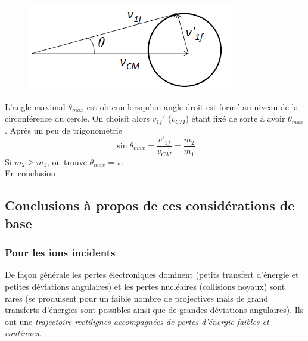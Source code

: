 	\begin{figure}
	\vspace{-5mm}
	\includegraphics[scale=0.65]{ch1/image12.png}
	\end{figure}

L'angle maximal $\theta_{max}$ est obtenu lorsqu'un angle droit est formé au niveau de la
circonférence du cercle. On choisit alors $v_{1f}'$ ($v_{CM}$) étant fixé de sorte à avoir
$\theta_{max}$. Après un peu de trigonométrie
\begin{equation}
\sin{\theta_{max}}=\frac{v'_{1f}}{v_{CM}}=\frac{m_2}{m_1}
\end{equation}
Si $m_2\geq m_1$, on trouve $\theta_{max}=\pi$. \\

En conclusion\\


\subsection{Conclusions à propos de ces considérations de base}
\subsubsection{Pour les ions incidents}
De façon générale les pertes électroniques dominent (petits transfert d'énergie et petites déviations
angulaires) et les pertes nucléaires (collisions noyaux) sont rares (se produisent pour un 
faible nombre de projectives mais de grand transferts d'énergies sont possibles ainsi que de 
grandes déviations angulaires). Ils ont une \textit{trajectoire rectilignes accompagnées de 
pertes d'énergie faibles et continues}.

